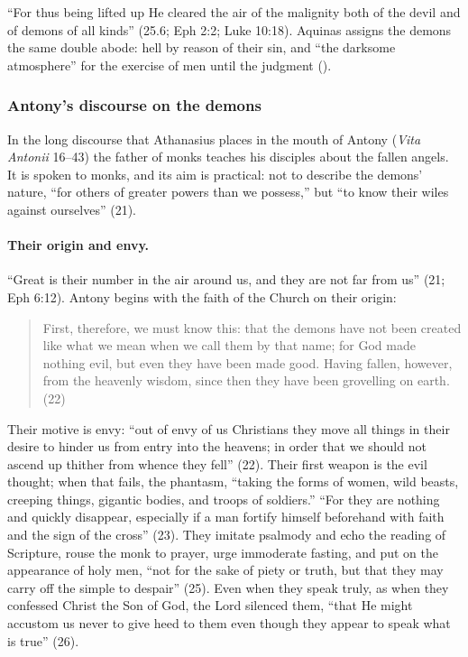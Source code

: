 \noindent ``For thus being lifted up He cleared the air of the malignity
both of the devil and of demons of all kinds'' (25.6; Eph 2:2; Luke
10:18). Aquinas assigns the demons the same double abode: hell by reason
of their sin, and ``the darksome atmosphere'' for the exercise of men
until the judgment ().

\subsubsection{Antony's discourse on the demons}

In the long discourse that Athanasius places in the mouth of Antony
(\emph{Vita Antonii} 16--43) the father of monks teaches his disciples
about the fallen angels. It is spoken to monks, and its aim is practical:
not to describe the demons' nature, ``for others of greater powers than we
possess,'' but ``to know their wiles against ourselves'' (21).

\paragraph{Their origin and envy.} ``Great is their number in the air
around us, and they are not far from us'' (21; Eph 6:12). Antony begins
with the faith of the Church on their origin:

\begin{quote}
First, therefore, we must know this: that the demons have not been
created like what we mean when we call them by that name; for God made
nothing evil, but even they have been made good. Having fallen, however,
from the heavenly wisdom, since then they have been grovelling on earth.
(22)
\end{quote}

\noindent Their motive is envy: ``out of envy of us Christians they move
all things in their desire to hinder us from entry into the heavens; in
order that we should not ascend up thither from whence they fell'' (22).
Their first weapon is the evil thought; when that fails, the phantasm,
``taking the forms of women, wild beasts, creeping things, gigantic
bodies, and troops of soldiers.'' ``For they are nothing and quickly
disappear, especially if a man fortify himself beforehand with faith and
the sign of the cross'' (23). They imitate psalmody and echo the reading
of Scripture, rouse the monk to prayer, urge immoderate fasting, and put
on the appearance of holy men, ``not for the sake of piety or truth, but
that they may carry off the simple to despair'' (25). Even when they
speak truly, as when they confessed Christ the Son of God, the Lord
silenced them, ``that He might accustom us never to give heed to them
even though they appear to speak what is true'' (26).

